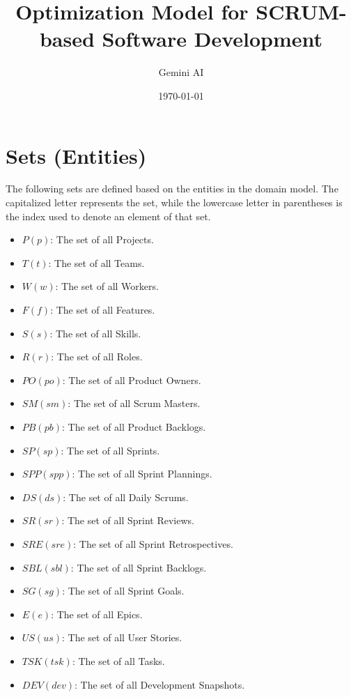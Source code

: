 \documentclass[11pt]{article}
\title{Optimization Model for SCRUM-based Software Development}
\author{Gemini AI}
\date{\today}
\begin{document}
\maketitle
\thispagestyle{empty}

\newpage
\tableofcontents
\thispagestyle{empty}

\newpage
\setcounter{page}{1}

\section{Sets (Entities)}
The following sets are defined based on the entities in the domain model. The capitalized letter represents the set, while the lowercase letter in parentheses is the index used to denote an element of that set.

\begin{itemize}
    \item $P (p)$: The set of all Projects.
    \item $T (t)$: The set of all Teams.
    \item $W (w)$: The set of all Workers.
    \item $F (f)$: The set of all Features.
    \item $S (s)$: The set of all Skills.
    \item $R (r)$: The set of all Roles.
    \item $PO (po)$: The set of all Product Owners.
    \item $SM (sm)$: The set of all Scrum Masters.
    \item $PB (pb)$: The set of all Product Backlogs.
    \item $SP (sp)$: The set of all Sprints.
    \item $SPP (spp)$: The set of all Sprint Plannings.
    \item $DS (ds)$: The set of all Daily Scrums.
    \item $SR (sr)$: The set of all Sprint Reviews.
    \item $SRE (sre)$: The set of all Sprint Retrospectives.
    \item $SBL (sbl)$: The set of all Sprint Backlogs.
    \item $SG (sg)$: The set of all Sprint Goals.
    \item $E (e)$: The set of all Epics.
    \item $US (us)$: The set of all User Stories.
    \item $TSK (tsk)$: The set of all Tasks.
    \item $DEV (dev)$: The set of all Development Snapshots.

\end{itemize}
\end{document}
